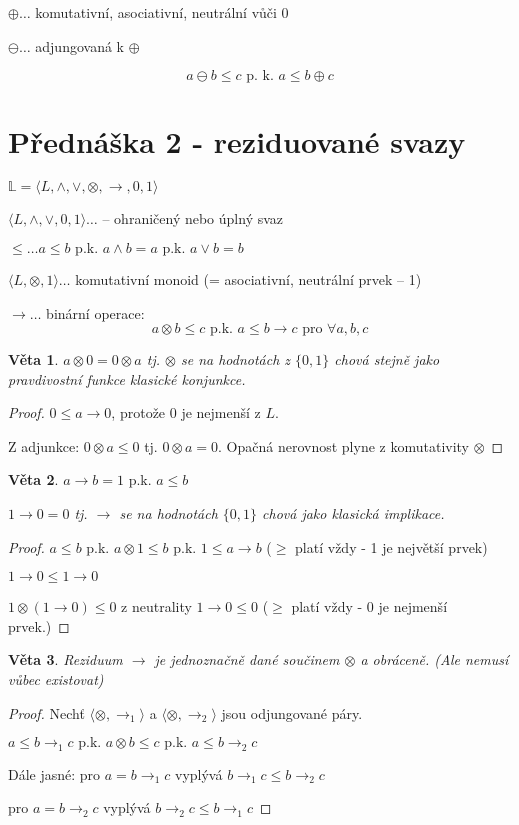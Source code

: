 \documentclass[10pt, a4paper, titlepage]{article}
\theoremstyle{note}
\newtheorem{veta}{Věta}
\newcommand{\pk}{\text{ p.k. }}
\newcommand{\rlat}{\langle L, \wedge, \vee,\otimes,\rightarrow,0,1\rangle}
\begin{document}
$\oplus\dots$ komutativní, asociativní, neutrální vůči 0

$\ominus\dots$ adjungovaná k $\oplus$

$$a\ominus b\leq c \text{ p. k. } a\leq b \oplus c$$

\section{Přednáška 2 - reziduované svazy}
$\mathbb{L} = \rlat$

$\langle L, \wedge,\vee, 0, 1\rangle \dots$ -- ohraničený nebo úplný svaz

$\leq \dots a\leq b \pk a \wedge b = a \pk a \vee b = b$

$\langle L, \otimes, 1\rangle\dots$ komutativní monoid (= asociativní, neutrální prvek -- 1)

$\rightarrow\dots$ binární operace: $$a\otimes b\leq c \pk a\leq b\rightarrow c \text{ pro } \forall a,b,c$$

\begin{veta}
$a\otimes 0 = 0\otimes a$ tj. $\otimes$ se na hodnotách z $\{0,1\}$ chová stejně jako pravdivostní funkce klasické konjunkce.
\end{veta}
\begin{proof}
$0\leq a \rightarrow 0$, protože $0$ je nejmenší z $L$.

Z adjunkce: $0\otimes a\leq 0$ tj. $0\otimes a=0$. Opačná nerovnost plyne z komutativity $\otimes$
\end{proof}
\begin{veta}
\label{v2}
$a\rightarrow b = 1 \pk a\leq b$

$1\rightarrow 0 = 0$ tj. $\rightarrow$ se na hodnotách $\{0,1\}$ chová jako klasická implikace.
\end{veta}
\begin{proof}
$a\leq b \pk a\otimes 1\leq b\pk 1\leq a\rightarrow b$ ($\geq$ platí vždy - 1 je největší prvek)

$1\rightarrow 0\leq 1\rightarrow 0$

$1\otimes (1\rightarrow 0)\leq 0$ z neutrality $1\rightarrow 0\leq 0$ ($\geq$ platí vždy - 0 je nejmenší prvek.)
\end{proof}
\begin{veta}
Reziduum $\rightarrow$ je jednoznačně dané součinem $\otimes$ a obráceně. (Ale nemusí vůbec existovat)
\end{veta}
\begin{proof}
Nechť $\langle \otimes ,\rightarrow_{1}\rangle$ a $\langle \otimes ,\rightarrow_{2}\rangle$ jsou odjungované páry.

$a\leq b\rightarrow_{1} c\pk a\otimes b\leq c\pk a\leq b\rightarrow_{2} c$

Dále jasné: pro $a=b\rightarrow_{1} c$ vyplývá $b\rightarrow_{1} c\leq b\rightarrow_{2} c$

\hspace{51pt}pro $a=b\rightarrow_{2} c$ vyplývá $b\rightarrow_{2} c\leq b\rightarrow_{1} c$
\end{proof}
\end{document}
